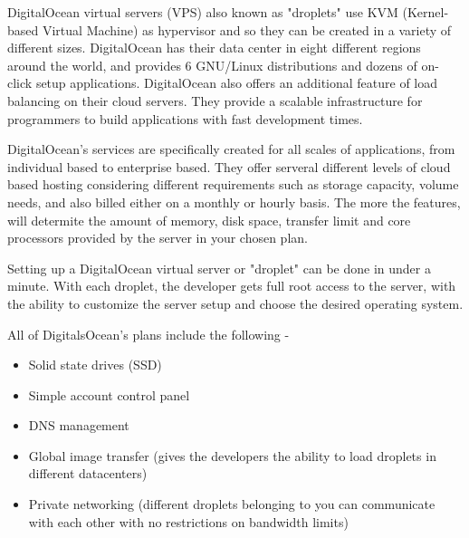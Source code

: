 \documentclass[../thesis.tex]{subfiles}
\begin{document}
DigitalOcean virtual servers (VPS) also known as "droplets" use KVM (Kernel-based Virtual Machine) as hypervisor and so they can be created in a variety of different sizes. DigitalOcean has their data center in eight different regions around the world, and provides 6 GNU/Linux distributions and dozens of on-click setup applications. DigitalOcean also offers an additional feature of load balancing on their cloud servers. They provide a scalable infrastructure for programmers to build applications with fast development times.
\newline

DigitalOcean's services are specifically created for all scales of applications, from individual based to enterprise based. They offer serveral different levels of cloud based hosting considering different requirements such as storage capacity, volume needs, and also billed either on a monthly or hourly basis. The more the features, will determite the amount of memory, disk space, transfer limit and core processors provided by the server in your chosen plan.
\newline

Setting up a DigitalOcean virtual server or "droplet" can be done in under a minute. With each droplet, the developer gets full root access to the server, with the ability to customize the server setup and choose the desired operating system.

All of DigitalsOcean's plans include the following - 
\begin{itemize}
	\item Solid state drives (SSD)
   
	\item Simple account control panel
   
	\item DNS management
   
	\item Global image transfer (gives the developers the ability to load droplets in different datacenters)
  
	\item Private networking (different droplets belonging to you can communicate with each other with no restrictions on bandwidth limits)  
\end{itemize}
\end{document}
